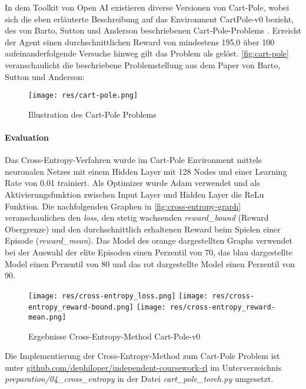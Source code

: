 \documentclass[11pt]{scrartcl}
\begin{document}
In dem Toolkit von Open AI existieren diverse Versionen von Cart-Pole, wobei sich die eben
erläuterte Beschreibung auf das Environment CartPole-v0 bezieht, des von Barto, Sutton und
Anderson beschriebenen Cart-Pole-Problems \cite[~S.838 f.]{BSA1983}. Erreicht der Agent einen
durchschnittlichen Reward von mindestens 195,0 über 100 aufeinanderfolgende Versuche hinweg gilt das
Problem als gelöst. \autoref{fig:cart-pole} veranschaulicht die beschriebene Problemstellung aus dem 
Paper\cite{BSA1983} von Barto, Sutton und Anderson:

\begin{figure}[htp]
\centering
\texttt{[image: res/cart-pole.png]}
\caption{Illustration des Cart-Pole Problems \cite[~S.838 f.]{BSA1983}}
\label{fig:cart-pole}
\end{figure}

\paragraph*{Evaluation}
\noindent
\newline
Das Cross-Entropy-Verfahren wurde im Cart-Pole Environment mittels neuronalen Netzes mit einem Hidden 
Layer mit 128 Nodes und einer Learning Rate von 0.01 trainiert. Als Optimizer wurde Adam verwendet und
als Aktivierungsfunktion zwischen Input Layer und Hidden Layer die ReLu Funktion. Die
nachfolgenden Graphen in \autoref{fig:cross-entropy-graph} veranschaulichen den \textit{loss}, den
stetig wachsenden \textit{reward\_bound} (Reward Obergrenze) und den durchschnittlich erhaltenen Reward
beim Spielen einer Episode (\textit{reward\_mean}). Das Model des orange dargestellten Graphs verwendet
bei der Auswahl der elite Episoden einen Perzentil von 70, das blau dargestellte Model einen Perzentil
von 80 und das rot dargestellte Model einen Perzentil von 90.

\begin{figure}[htp]
\centering
\texttt{[image: res/cross-entropy\_loss.png]}
\texttt{[image: res/cross-entropy\_reward-bound.png]}
\texttt{[image: res/cross-entropy\_reward-mean.png]}
\caption{Ergebnisse Cross-Entropy-Method Cart-Pole-v0}
\label{fig:cross-entropy-graph}
\end{figure}

Die Implementierung der Cross-Entropy-Method zum Cart-Pole Problem ist unter
\url{github.com/dephiloper/independent-coursework-rl} im Unterverzeichnis 
\textit{preparation/04\_cross\_entropy} in der Datei \textit{cart\_pole\_torch.py} umgesetzt.
\end{document}
